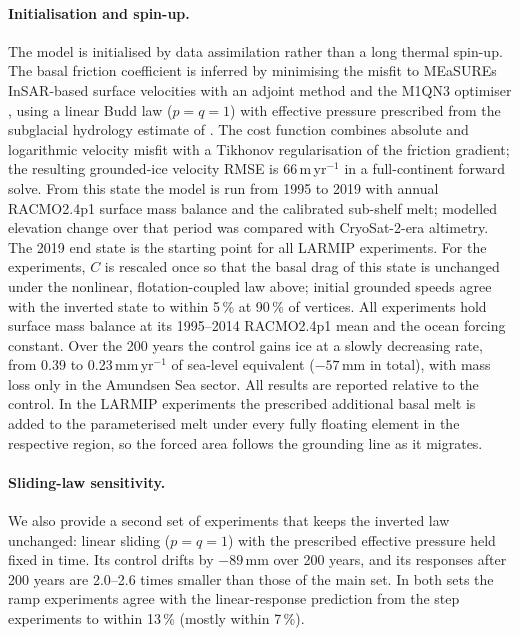 \paragraph{Initialisation and spin-up.}
The model is initialised by data assimilation rather than a long thermal spin-up. The basal
friction coefficient is inferred by minimising the misfit to MEaSUREs InSAR-based surface
velocities \citep{rignot2011,mouginot2019} with an adjoint method \citep{morlighem2010} and the
M1QN3 optimiser \citep{gilbert1989}, using a linear Budd law ($p = q = 1$) with effective pressure
prescribed from the subglacial hydrology estimate of \citet{ehrenfeucht2025}. The cost function
combines absolute and logarithmic velocity misfit with a Tikhonov regularisation of the friction
gradient; the resulting grounded-ice velocity RMSE is 66\,m\,yr$^{-1}$ in a full-continent forward
solve. From this state the model is run from 1995 to 2019 with annual RACMO2.4p1 surface mass
balance and the calibrated sub-shelf melt; modelled elevation change over that period was compared
with CryoSat-2-era altimetry. The 2019 end state is the starting point for all LARMIP experiments.
For the experiments, $C$ is rescaled once so that the basal drag of this state is unchanged under the
nonlinear, flotation-coupled law above; initial grounded speeds agree with the inverted state to
within 5\,\% at 90\,\% of vertices. All experiments hold surface mass balance at its 1995--2014
RACMO2.4p1 mean and the ocean forcing constant. Over the 200 years the control gains ice at a slowly
decreasing rate, from 0.39 to 0.23\,mm\,yr$^{-1}$ of sea-level equivalent ($-57$\,mm in total), with
mass loss only in the Amundsen Sea sector. All results are reported relative to the control. In the
LARMIP experiments the prescribed additional basal melt is added to the parameterised melt under
every fully floating element in the respective region, so the forced area follows the grounding line
as it migrates.

\paragraph{Sliding-law sensitivity.}
We also provide a second set of experiments that keeps the inverted law unchanged: linear sliding
($p = q = 1$) with the prescribed effective pressure held fixed in time. Its control drifts by
$-89$\,mm over 200 years, and its responses after 200 years are 2.0--2.6 times smaller than those of
the main set. In both sets the ramp experiments agree with the linear-response prediction from the
step experiments to within 13\,\% (mostly within 7\,\%).

